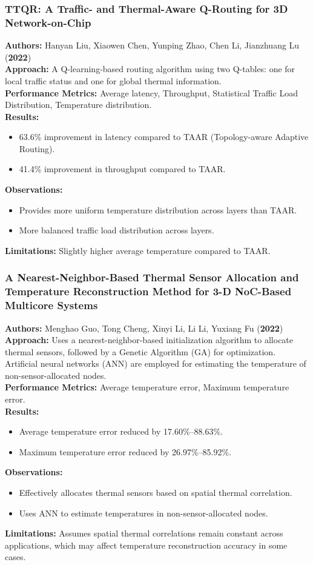 \documentclass{beamer}
\begin{document}
\begin{frame}[fragile]
\frametitle{TTQR: A Traffic- and Thermal-Aware Q-Routing for 3D Network-on-Chip}

\textbf{Authors:} Hanyan Liu, Xiaowen Chen, Yunping Zhao, Chen Li, Jianzhuang Lu (\textbf{2022}) \\
\textbf{Approach:} A Q-learning-based routing algorithm using two Q-tables: one for local traffic status and one for global thermal information. \\
\textbf{Performance Metrics:} Average latency, Throughput, Statistical Traffic Load Distribution, Temperature distribution. \\
\textbf{Results:} 
\begin{itemize}
    \item 63.6\% improvement in latency compared to TAAR (Topology-aware Adaptive Routing).
    \item 41.4\% improvement in throughput compared to TAAR.
\end{itemize}
\textbf{Observations:} 
\begin{itemize}
    \item Provides more uniform temperature distribution across layers than TAAR.
    \item More balanced traffic load distribution across layers.
\end{itemize}
\textbf{Limitations:} Slightly higher average temperature compared to TAAR.
\end{frame}

\begin{frame}[fragile]
\frametitle{A Nearest-Neighbor-Based Thermal Sensor Allocation and Temperature Reconstruction Method for 3-D NoC-Based Multicore Systems}

\small
\textbf{Authors:} Menghao Guo, Tong Cheng, Xinyi Li, Li Li, Yuxiang Fu (\textbf{2022}) \\
\textbf{Approach:} Uses a nearest-neighbor-based initialization algorithm to allocate thermal sensors, followed by a Genetic Algorithm (GA) for optimization. Artificial neural networks (ANN) are employed for estimating the temperature of non-sensor-allocated nodes. \\
\textbf{Performance Metrics:} Average temperature error, Maximum temperature error. \\
\textbf{Results:} 
\begin{itemize}
    \item Average temperature error reduced by 17.60\%–88.63\%.
    \item Maximum temperature error reduced by 26.97\%–85.92\%.
\end{itemize}
\textbf{Observations:} 
\begin{itemize}
    \item Effectively allocates thermal sensors based on spatial thermal correlation.
    \item Uses ANN to estimate temperatures in non-sensor-allocated nodes.
\end{itemize}
\textbf{Limitations:} Assumes spatial thermal correlations remain constant across applications, which may affect temperature reconstruction accuracy in some cases.
\end{frame}
\end{document}
